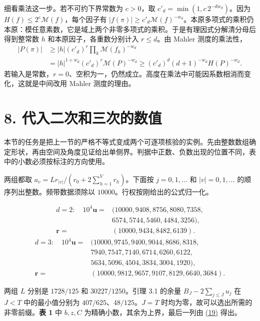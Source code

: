 \documentclass[11pt,a4paper]{article}
\begin{document}
细看乘法这一步。若不可约下界常数为 \(c>0\)，取 \(c'_d=\min(1,c\,2^{-dw_d})\)。因为 \(H(f)\le2^e\mathcal M(f)\)，每个因子有 \(|f(\pi)|\ge c'_d\mathcal M(f)^{-w_d}\)。本原多项式的乘积仍本原：模任意素数，它是域上两个非零多项式的乘积。于是有理因式分解清分母后得到整常数 \(h\) 和本原因子，各重数分别计入 \(r\le d\)。由 Mahler 测度的乘法性， \[
 \begin{aligned}
 |P(\pi)|&\ge |h|(c'_d)^r\prod_k\mathcal M(f_k)^{-w_d}\\
 &=|h|^{1+w_d}(c'_d)^r\mathcal M(P)^{-w_d}
 \ge(c'_d)^d(d+1)^{-w_d}H(P)^{-w_d}.
 \end{aligned}
\] 若输入是常数，\(r=0\)、空积为一，仍然成立。高度在乘法中可能因系数相消而变化，这就是中间改用 Mahler 测度的理由。

\section{8. 代入二次和三次的数值}\label{ux4ee3ux5165ux4e8cux6b21ux548cux4e09ux6b21ux7684ux6570ux503c}

本节的任务是把上一节的严格不等式变成两个可逐项核验的实例。先由整数数组确定形状，再由空间及角度见证给出单侧界。判据中正数、负数出现的位置不同，表中的小数必须按标注的方向使用。

两组都取 \(a_v=Lr_{|v|}/(r_0+2\sum_{h=1}^Vr_h)\)。下面按 \(j=0,1,\ldots\) 和 \(|v|=0,1,\ldots\) 的顺序列出整数。频带数据须除以 \(10000\)。行权按刚给出的公式归一化。

\[
\begin{aligned}
 d=2:\quad 10^4\mathbf u={}&(10000,9408,8756,8080,7358,\\
 &6574,5744,5460,4484,3256),\\
 \mathbf r={}&(10000,9434,8482,6139).
\end{aligned}
\] \[
\begin{aligned}
 d=3:\quad 10^4\mathbf u={}&(10000,9745,9400,9044,8686,8318,\\
 &7940,7547,7140,6714,6260,6122,\\
 &5634,5096,4504,3834,3004,1920),\\
 \mathbf r={}&(10000,9812,9657,9107,8129,6640,3684).
\end{aligned}
\]

两组 \(L\) 分别是 \(1728/125\) 和 \(30227/1250\)。引理 3.1 的余量 \(B_J-2\sum_{j\le J}u_j\) 在 \(J<T\) 中的最小值分别为 \(407/625\)、\(48/125\)。\(J=T\) 时均为零，故可以选出所需的非零前缀。\textbf{表 1} 中 \(b,z,C\) 为精确小数，其余为上界，最后一列由 \hyperref[eq:19]{(19)} 得出。
\end{document}

